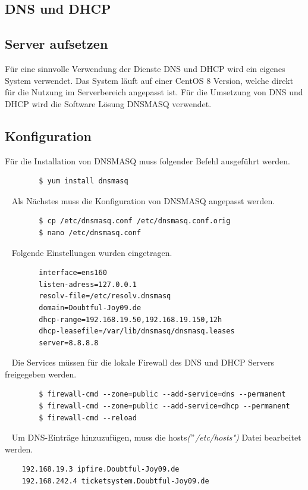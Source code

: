 \documentclass{scrartcl}
\begin{document}
\begin{flushleft}
    \newpage

    \section{DNS und DHCP}
    \subsection{Server aufsetzen}
    Für eine sinnvolle Verwendung der Dienste DNS und DHCP wird ein eigenes System verwendet. Das System läuft auf einer CentOS 8 Version, welche direkt für die Nutzung im Serverbereich angepasst ist. Für die Umsetzung von DNS und DHCP wird die Software Lösung DNSMASQ verwendet.

    \subsection{Konfiguration}
    Für die Installation von DNSMASQ muss folgender Befehl ausgeführt werden.
    \begin{lstlisting}
        $ yum install dnsmasq\end{lstlisting}
    \ \newline
    Als Nächstes muss die Konfiguration von DNSMASQ angepasst werden.
    \begin{lstlisting}
        $ cp /etc/dnsmasq.conf /etc/dnsmasq.conf.orig
        $ nano /etc/dnsmasq.conf\end{lstlisting}
    \ \newline
    Folgende Einstellungen wurden eingetragen.
    \begin{lstlisting}
        interface=ens160
        listen-adress=127.0.0.1
        resolv-file=/etc/resolv.dnsmasq
        domain=Doubtful-Joy09.de
        dhcp-range=192.168.19.50,192.168.19.150,12h
        dhcp-leasefile=/var/lib/dnsmasq/dnsmasq.leases
        server=8.8.8.8\end{lstlisting}
    \ \newline
    Die Services müssen für die lokale Firewall des DNS und DHCP Servers freigegeben werden.
    \begin{lstlisting}
        $ firewall-cmd --zone=public --add-service=dns --permanent
        $ firewall-cmd --zone=public --add-service=dhcp --permanent
        $ firewall-cmd --reload\end{lstlisting}
    \ \newline
    Um DNS-Einträge hinzuzufügen, muss die hosts\textit{($"$/etc/hosts")} Datei bearbeitet werden.
    \begin{lstlisting}
    192.168.19.3 ipfire.Doubtful-Joy09.de
    192.168.242.4 ticketsystem.Doubtful-Joy09.de\end{lstlisting}


\end{flushleft}
\end{document}
